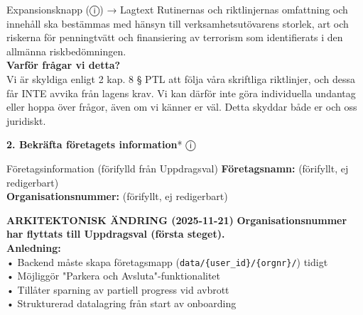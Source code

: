 \documentclass[10pt]{beamer}
\begin{document}
\begin{frame}[label=riskfragor-steg1]
\begin{alertblock}{Expansionsknapp (ⓘ) → Lagtext}
    \tiny Rutinernas och riktlinjernas omfattning och innehåll ska bestämmas med hänsyn till 
    verksamhetsutövarens storlek, art och riskerna för penningtvätt och finansiering av terrorism 
    som identifierats i den allmänna riskbedömningen.\\[0.1cm]
    
    \tiny \textbf{Varför frågar vi detta?}\\
    \tiny Vi är skyldiga enligt 2 kap. 8 § PTL att följa våra skriftliga riktlinjer, 
    och dessa får INTE avvika från lagens krav. Vi kan därför inte göra individuella 
    undantag eller hoppa över frågor, även om vi känner er väl. Detta skyddar både er 
    och oss juridiskt.\\[0.1cm]
  \end{alertblock}

  \vspace{0.2cm}

  \textbf{2. Bekräfta företagets information}* \hspace{0.3cm} ⓘ\\
  \vspace{0.2cm}
  
  \begin{block}{Företagsinformation (förifylld från Uppdragsval)}
    \tiny \textbf{Företagsnamn:} \underline{\hspace{6cm}} (förifyllt, ej redigerbart)\\[0.2cm]
    \tiny \textbf{Organisationsnummer:} \underline{\hspace{4cm}} (förifyllt, ej redigerbart)\\[0.2cm]
  \end{block}
  
  \begin{block}{\textbf{ARKITEKTONISK ÄNDRING (2025-11-21)}}
    \tiny
    \textbf{Organisationsnummer har flyttats till Uppdragsval (första steget).}\\[0.2cm]
    
    \tiny \textbf{Anledning:}\\
    \tiny • Backend måste skapa företagsmapp (\texttt{data/\{user\_id\}/\{orgnr\}/}) tidigt\\
    \tiny • Möjliggör "Parkera och Avsluta"-funktionalitet\\
    \tiny • Tillåter sparning av partiell progress vid avbrott\\
    \tiny • Strukturerad datalagring från start av onboarding\\[0.2cm]
    

\end{block}
\end{frame}
\end{document}
